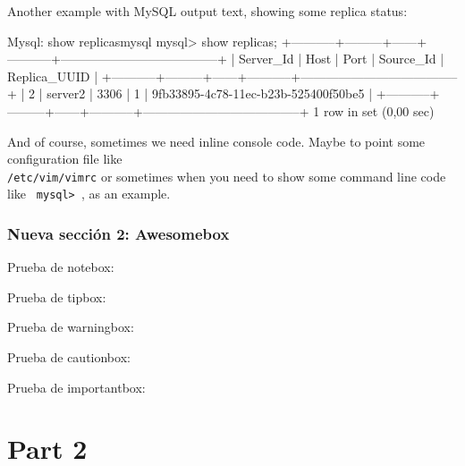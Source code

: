 \documentclass{yukibook}
\begin{document}
Another example with MySQL output text, showing some replica status:

\begin{mycode}{Mysql: show replicas}{mysql}{\footnotesize}
mysql> show replicas;
+-----------+---------+------+-----------+--------------------------------------+
| Server_Id | Host    | Port | Source_Id | Replica_UUID                         |
+-----------+---------+------+-----------+--------------------------------------+
|         2 | server2 | 3306 |         1 | 9fb33895-4c78-11ec-b23b-525400f50be5 |
+-----------+---------+------+-----------+--------------------------------------+
1 row in set (0,00 sec)
\end{mycode}

And of course, sometimes we need inline console code. Maybe to point some configuration file like \\ \texttt{/etc/vim/vimrc} or sometimes when you need to show some command line code like \texttt{ mysql> }, as an example.


\section{Nueva sección 2: Awesomebox}
Prueba de notebox:

\notebox{\Blindtext[1]}

Prueba de tipbox:
\tipbox{\Blindtext[1]}

Prueba de warningbox:
\warningbox{\Blindtext[1]}

Prueba de cautionbox:
\cautionbox{\Blindtext[1]}

Prueba de importantbox:
\importantbox{\Blindtext[1]}


\begin{info-box}
  \notebox{\Blindtext[1]}
\end{info-box}
\begin{warning-box}
  \Blindtext[1]
\end{warning-box}

\errorbox{\Blindtext[1]}

\part{Part 2}
\Blinddocument

\end{document}
